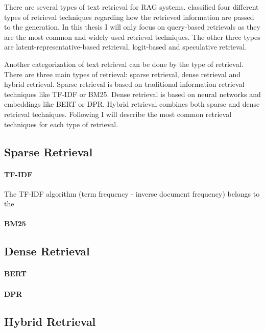 
There are several types of text retrieval for RAG systems. \cite{Zhao.29.02.2024} classified four different types of retrieval techniques regarding how the retrieved information are passed to the generation. In this thesis I will only focus on query-based retrievals as they are the most common and widely used retrieval techniques. The other three types are latent-representative-based retrieval, logit-based and speculative retrieval.

Another categorization of text retrieval can be done by the type of retrieval. There are three main types of retrieval: sparse retrieval, dense retrieval and hybrid retrieval. Sparse retrieval is based on traditional information retrieval techniques like TF-IDF or BM25. Dense retrieval is based on neural networks and embeddings like BERT or DPR. Hybrid retrieval combines both sparse and dense retrieval techniques. Following I will describe the most common retrieval techniques for each type of retrieval.

\subsection{Sparse Retrieval}
\label{sec:sparse_retrieval}

\paragraph{TF-IDF}
\label{sec:tfidf}

The TF-IDF algorithm (term frequency - inverse document frequency) belongs to the 

\paragraph{BM25}
\label{sec:bm25}

\subsection{Dense Retrieval}
\label{sec:dense_retrieval}

\paragraph{BERT}
\label{sec:bert}

\paragraph{DPR}
\label{sec:dpr}

\subsection{Hybrid Retrieval}
\label{sec:hybrid_retrieval}